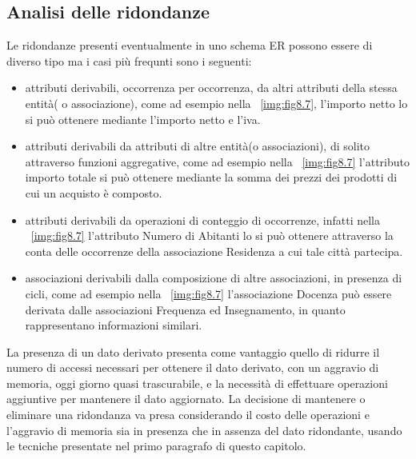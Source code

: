 \subsection{Analisi delle ridondanze}
Le ridondanze presenti eventualmente in uno schema ER possono essere di diverso tipo ma i casi più frequnti sono i seguenti:
\begin{itemize}
    \item attributi derivabili, occorrenza per occorrenza, da altri attributi della stessa entità( o associazione), 
          come ad esempio nella \figurename~\ref{img:fig8.7}, l'importo netto lo si può ottenere mediante 
          l'importo netto e l'iva.
    \item attributi derivabili da attributi di altre entità(o associazioni), di solito attraverso funzioni aggregative,
          come ad esempio nella \figurename~\ref{img:fig8.7} l'attributo importo totale si può ottenere mediante
          la somma dei prezzi dei prodotti di cui un acquisto è composto.
    \item attributi derivabili da operazioni di conteggio di occorrenze, infatti nella \figurename~\ref{img:fig8.7}
          l'attributo Numero di Abitanti lo si può ottenere attraverso la conta delle occorrenze della associazione
          Residenza a cui tale città partecipa.
    \item associazioni derivabili dalla composizione di altre associazioni, in presenza di cicli, come ad esempio
          nella \figurename~\ref{img:fig8.7} l'associazione Docenza può essere derivata dalle associazioni 
          Frequenza ed Insegnamento, in quanto rappresentano informazioni similari.
\end{itemize}
La presenza di un dato derivato presenta come vantaggio quello di ridurre il numero di accessi necessari per ottenere
il dato derivato, con un aggravio di memoria, oggi giorno quasi trascurabile, e la necessità di effettuare operazioni
aggiuntive per mantenere il dato aggiornato.\newline
La decisione di mantenere o eliminare una ridondanza va presa considerando il costo delle operazioni e l'aggravio di memoria
sia in presenza che in assenza del dato ridondante, usando le tecniche presentate nel primo paragrafo di questo capitolo.

